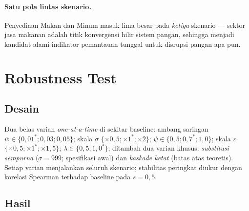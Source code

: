 \documentclass[11pt,a4paper]{article}
\begin{document}
\paragraph{Satu pola lintas skenario.} Penyediaan Makan dan Minum masuk
lima besar pada \emph{ketiga} skenario --- sektor jasa makanan adalah
titik konvergensi hilir sistem pangan, sehingga menjadi kandidat alami
indikator pemantauan tunggal untuk disrupsi pangan apa pun.

\section{Robustness Test}
\label{sec:robust}

\subsection{Desain}

Dua belas varian \emph{one-at-a-time} di sekitar baseline: ambang saringan
$\bar w \in \{0{,}01^*; 0{,}03; 0{,}05\}$; skala $\sigma$
$\{{\times}0{,}5; {\times}1^*; {\times}2\}$; $\psi \in \{0{,}5; 0{,}7^*;
1{,}0\}$; skala $\varepsilon$ $\{{\times}0{,}5; {\times}1^*;
{\times}1{,}5\}$; $\lambda \in \{0{,}5; 1{,}0^*\}$; ditambah dua varian
khusus: \emph{substitusi sempurna} ($\sigma = 999$; spesifikasi awal) dan
\emph{kaskade ketat} (batas atas teoretis). Setiap varian menjalankan
seluruh skenario; stabilitas peringkat diukur dengan korelasi Spearman
terhadap baseline pada $s = 0{,}5$.

\subsection{Hasil}
\end{document}
